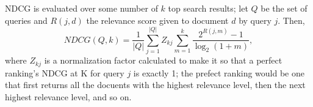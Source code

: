 NDCG is evaluated over some number of $k$ top search results; let $Q$ be the set of queries and $R(j,d)$ the relevance score given to document $d$ by query $j$. Then,
\begin{equation*}
    NDCG(Q,k) = \frac{1}{|Q|} \sum_{j=1}^{|Q|} Z_{kj} \sum_{m=1}^k  \frac{2^{R(j,m)} - 1}{\log_2 (1+m)} ,
\end{equation*}
where $Z_{kj}$ is a normalization factor calculated to make it so that a perfect ranking's NDCG at K for query $j$ is exactly 1; the prefect ranking would be one that first returns all the docuents with the highest relevance level, then the next highest relevance level, and so on.